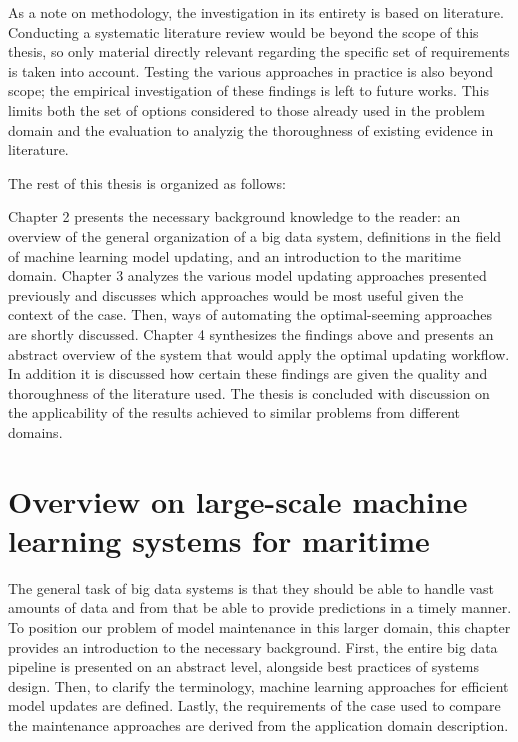 
As a note on methodology, the investigation in its entirety is based on literature. Conducting a systematic literature review would be beyond the scope of this thesis, so only material directly relevant regarding the specific set of requirements is taken into account. Testing the various approaches in practice is also beyond scope; the empirical investigation of these findings is left to future works. This limits both the set of options considered to those already used in the problem domain and the evaluation to analyzig the thoroughness of existing evidence in literature.


The rest of this thesis is organized as follows:

Chapter 2 presents the necessary background knowledge to the reader: an overview of the general organization of a big data system, definitions in the field of machine learning model updating, and an introduction to the maritime domain. Chapter 3 analyzes the various model updating approaches presented previously and discusses which approaches would be most useful given the context of the case. Then, ways of automating the optimal-seeming approaches are shortly discussed. Chapter 4 synthesizes the findings above and presents an abstract overview of the system that would apply the optimal updating workflow. In addition it is discussed how certain these findings are given the quality and thoroughness of the literature used. The thesis is concluded with discussion on the applicability of the results achieved to similar problems from different domains.

\chapter{Overview on large-scale machine\\ learning systems for maritime}



The general task of big data systems is that they should be able to handle vast amounts of data and from that be able to provide predictions in a timely manner. To position our problem of model maintenance in this larger domain, this chapter provides an introduction to the necessary background. First, the entire big data pipeline is presented on an abstract level, alongside best practices of systems design. Then, to clarify the terminology, machine learning approaches for efficient model updates are defined. Lastly, the requirements of the case used to compare the maintenance approaches are derived from the application domain description.

